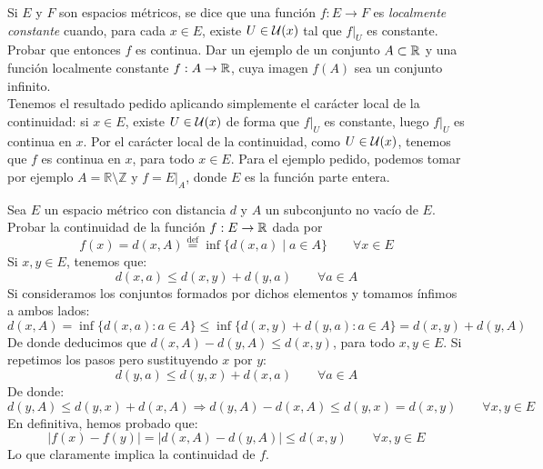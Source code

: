 \begin{ejercicio}
    Si $E$ y $F$ son espacios métricos, se dice que una función $f:E\to F$ es \emph{localmente constante} cuando, para cada $x\in E$, existe $U \in \mathcal{U}(x)$ tal que $f\big|_{U}$ es constante. Probar que entonces $f$ es continua. Dar un ejemplo de un conjunto $A \subset \mathbb{R}$ y una función localmente
    constante $f : A\to \mathbb{R}$, cuya imagen $f(A)$ sea un conjunto infinito.\\

    \noindent
    Tenemos el resultado pedido aplicando simplemente el carácter local de la continuidad: si $x\in E$, existe $U\in \mathcal{U}(x)$ de forma que $f\big|_{U}$ es constante, luego $f\big|_{U}$ es continua en $x$. Por el carácter local de la continuidad, como $U\in \mathcal{U}(x)$, tenemos que $f$ es continua en $x$, para todo $x\in E$. Para el ejemplo pedido, podemos tomar por ejemplo $A = \mathbb{R}\setminus \mathbb{Z}$ y $f = E\big|_{A}$, donde $E$ es la función parte entera.
\end{ejercicio}

\begin{ejercicio}
    Sea $E$ un espacio métrico con distancia $d$ y $A$ un subconjunto no vacío de $E$. Probar la continuidad de la función $f : E \to \mathbb{R}$ dada por
    \begin{equation*}
        f(x)=d(x,A)\stackrel{\text{def}}{=}\inf\{d(x,a)\mid a \in A\} \qquad \forall x\in E
    \end{equation*}
    Si $x,y\in E$, tenemos que:
    \begin{equation*}
        d(x,a) \leq d(x,y) + d(y,a) \qquad \forall a\in A
    \end{equation*}
    Si consideramos los conjuntos formados por dichos elementos y tomamos ínfimos a ambos lados:
    \begin{equation*}
        d(x,A) = \inf\{d(x,a):a\in A\} \leq \inf\{d(x,y)+d(y,a):a\in A\} = d(x,y)+d(y,A)
    \end{equation*}
    De donde deducimos que $d(x,A) - d(y,A) \leq d(x,y)$, para todo $x,y\in E$. Si repetimos los pasos pero sustituyendo $x$ por $y$:
    \begin{equation*}
        d(y,a) \leq d(y,x) + d(x,a) \qquad \forall a\in A
    \end{equation*}
    De donde:
    \begin{equation*}
        d(y,A) \leq d(y,x) + d(x,A) \Longrightarrow d(y,A) - d(x,A) \leq d(y,x) = d(x,y) \qquad \forall x,y\in E
    \end{equation*}
    En definitiva, hemos probado que:
    \begin{equation*}
        |f(x) - f(y)| = \left|d(x,A)-d(y,A)\right| \leq d(x,y) \qquad \forall x,y\in E
    \end{equation*}
    Lo que claramente implica la continuidad de $f$.
\end{ejercicio}

